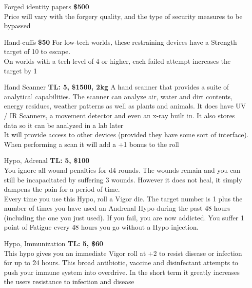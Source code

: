 \begin{genericsection}{Forged identity papers}
\textbf{\$500}\\
Price will vary with the forgery quality, and the type of security measures to be bypassed
\end{genericsection}

\begin{genericsection}{Hand-cuffs}
\textbf{\$50}
For low-tech worlds, these restraining devices have a Strength target of 10	to escape.\\
On worlds with a tech-level of 4 or higher, each failed attempt increases the target by 1
\end{genericsection}

\begin{genericsection}{Hand Scanner}
\textbf{TL: 5, \$1500, 2kg}
A hand scanner that provides a suite of analytical capabilities. The scanner can analyze air, water and dirt contents, energy residues, weather patterns as well as plants and animals. It does have UV / IR Scanners, a movement detector and even an x-ray built in. It also stores data so it can be analyzed in a lab later\\
It will provide access to other devices (provided they have some sort of interface). When performing a scan it will add a +1 bonus to the roll
\end{genericsection}

\begin{genericsection}{Hypo, Adrenal}
\textbf{TL: 5, \$100}\\
You ignore all wound penalties for d4 rounds. The wounds remain and you can still be incapacitated by suffering 3 wounds. However it does not heal, it simply dampens the pain for a period of time.\\
Every time you use this Hypo, roll a Vigor die. The target number is 1 plus the number of times you have used an Andrenal Hypo during the past 48 hours (including the one you just used). If you fail, you are now addicted. You suffer 1 point of Fatigue every 48 hours you go without a Hypo injection.
\end{genericsection}

\begin{genericsection}{Hypo, Immunization}
\textbf{TL: 5, \$60}\\
This hypo gives you an immediate Vigor roll at +2 to resist disease or infection for up to 24 hours. This broad  antibiotic, vaccine and disinfectant attempts to push your immune system into overdrive. In the short term it greatly increases the users resistance to infection and disease
\end{genericsection}

